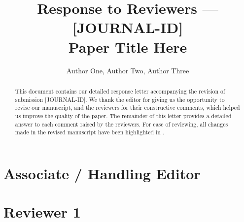 \documentclass{article}
\begin{document}
\title{Response to Reviewers --- [JOURNAL-ID]\\\large{Paper Title Here}}

\author{Author One, Author Two, Author Three}

\maketitle

\begin{abstract}
This document contains our detailed response letter accompanying the revision of submission [JOURNAL-ID].
We thank the editor for giving us the opportunity to revise our manuscript, and the reviewers for their constructive comments, which helped us improve the quality of the paper.
The remainder of this letter provides a detailed answer to each comment raised by the reviewers.
For ease of reviewing, all changes made in the revised manuscript have been highlighted in .
\end{abstract}


\newpage
\section*{Associate / Handling Editor}




\newpage
\section*{Reviewer 1}
\end{document}
